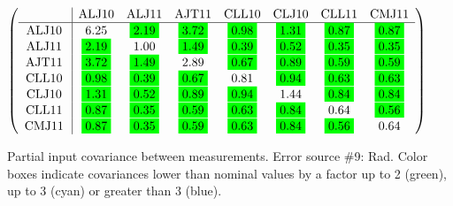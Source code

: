 \begin{table}[H]
\scriptsize
\begin{center}
\renewcommand{\arraystretch}{1.1}
\begin{math}\left(\begin{array}{c|ccccccc}
 & \mathrm{ALJ10} & 
\mathrm{ALJ11} & 
\mathrm{AJT11} & 
\mathrm{CLL10} & 
\mathrm{CLJ10} & 
\mathrm{CLL11} & 
\mathrm{CMJ11} \\
\hline
\mathrm{ALJ10} \hspace*{2pt} &       6.25 &  \colorbox{Green1}{$      2.19$} &  \colorbox{Green1}{$      3.72$} &  \colorbox{Green1}{$      0.98$} &  \colorbox{Green1}{$      1.31$} &  \colorbox{Green1}{$      0.87$} &  \colorbox{Green1}{$      0.87$} \\
\mathrm{ALJ11} \hspace*{2pt} &  \colorbox{Green1}{$      2.19$} &       1.00 &  \colorbox{Green1}{$      1.49$} &  \colorbox{Green1}{$      0.39$} &  \colorbox{Green1}{$      0.52$} &  \colorbox{Green1}{$      0.35$} &  \colorbox{Green1}{$      0.35$} \\
\mathrm{AJT11} \hspace*{2pt} &  \colorbox{Green1}{$      3.72$} &  \colorbox{Green1}{$      1.49$} &       2.89 &  \colorbox{Green1}{$      0.67$} &  \colorbox{Green1}{$      0.89$} &  \colorbox{Green1}{$      0.59$} &  \colorbox{Green1}{$      0.59$} \\
\mathrm{CLL10} \hspace*{2pt} &  \colorbox{Green1}{$      0.98$} &  \colorbox{Green1}{$      0.39$} &  \colorbox{Green1}{$      0.67$} &       0.81 &  \colorbox{Green1}{$      0.94$} &  \colorbox{Green1}{$      0.63$} &  \colorbox{Green1}{$      0.63$} \\
\mathrm{CLJ10} \hspace*{2pt} &  \colorbox{Green1}{$      1.31$} &  \colorbox{Green1}{$      0.52$} &  \colorbox{Green1}{$      0.89$} &  \colorbox{Green1}{$      0.94$} &       1.44 &  \colorbox{Green1}{$      0.84$} &  \colorbox{Green1}{$      0.84$} \\
\mathrm{CLL11} \hspace*{2pt} &  \colorbox{Green1}{$      0.87$} &  \colorbox{Green1}{$      0.35$} &  \colorbox{Green1}{$      0.59$} &  \colorbox{Green1}{$      0.63$} &  \colorbox{Green1}{$      0.84$} &       0.64 &  \colorbox{Green1}{$      0.56$} \\
\mathrm{CMJ11} \hspace*{2pt} &  \colorbox{Green1}{$      0.87$} &  \colorbox{Green1}{$      0.35$} &  \colorbox{Green1}{$      0.59$} &  \colorbox{Green1}{$      0.63$} &  \colorbox{Green1}{$      0.84$} &  \colorbox{Green1}{$      0.56$} &       0.64 \\
\end{array}\right)\end{math}
\caption{Partial input covariance between measurements. Error source \#9: Rad. Color boxes indicate covariances lower than nominal values by a factor up to 2 (green), up to 3 (cyan) or greater than 3 (blue).}
\renewcommand{\arraystretch}{1}
\end{center}
\end{table}
